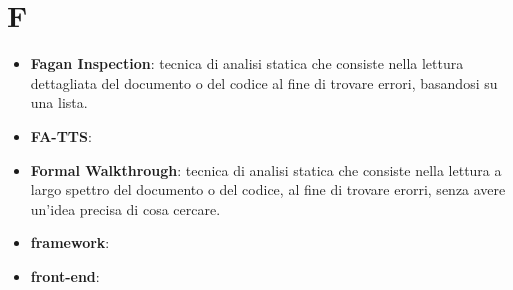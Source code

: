 \section{F}
\begin{itemize} 
	\item \textbf{Fagan Inspection}: tecnica di analisi statica che consiste nella lettura dettagliata del documento o del codice al fine di trovare errori, basandosi su una lista.
	\item \textbf{FA-TTS}:
	\item \textbf{Formal Walkthrough}: tecnica di analisi statica che consiste nella lettura a largo spettro del documento o del codice, al fine di trovare erorri, senza avere un'idea precisa di cosa cercare.
	\item \textbf{framework}:
 	\item \textbf{front-end}:
\end{itemize}